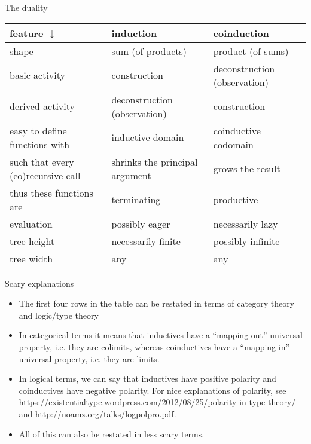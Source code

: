 \documentclass{beamer}
\begin{document}
\begin{frame}{The duality}
\begin{tabular}{ | p{3cm} | p{3cm} | p{3cm} | }
	\hline
	feature $\downarrow$ & induction & coinduction \\\hline
	shape & sum (of products) & product (of sums) \\\hline
	basic activity & construction & deconstruction (observation) \\\hline
	derived activity & deconstruction (observation) & construction \\\hline
	easy to define functions with & inductive domain & coinductive codomain \\\hline
	such that every (co)recursive call & shrinks the principal argument & grows the result \\\hline
	thus these functions are & terminating & productive \\\hline
	evaluation & possibly eager & necessarily lazy \\\hline
	tree height & necessarily finite & possibly infinite \\\hline
	tree width & any & any \\\hline
\end{tabular}
\end{frame}

\begin{frame}{Scary explanations}
\begin{itemize}
	\item The first four rows in the table can be restated in terms of category theory and logic/type theory
	\item In categorical terms it means that inductives have a ``mapping-out'' universal property, i.e. they are colimits, whereas coinductives have a ``mapping-in'' universal property, i.e. they are limits.
	\item In logical terms, we can say that inductives have positive polarity and coinductives have negative polarity. For nice explanations of polarity, see \url{https://existentialtype.wordpress.com/2012/08/25/polarity-in-type-theory/} and \url{http://noamz.org/talks/logpolpro.pdf}.
	\item All of this can also be restated in less scary terms.
\end{itemize}
\end{frame}
\end{document}
